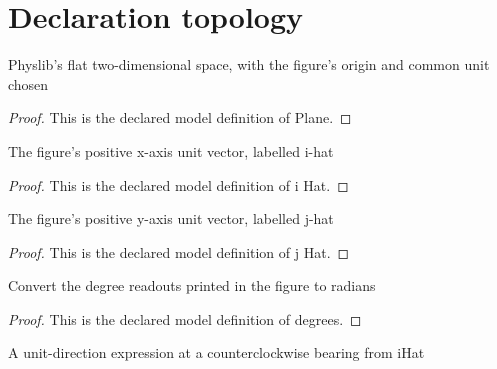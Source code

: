 \section{Declaration topology}
\begin{definition}[Plane]
  \label{def:physics:phyx-mini-0791:phyxminiproblems-problemphyxmini0791-plane}
  Physlib's flat two-dimensional space, with the figure's origin and common unit chosen
\end{definition}
\begin{proof}
  This is the declared model definition of Plane.
\end{proof}
\begin{definition}[i Hat]
  \label{def:physics:phyx-mini-0791:phyxminiproblems-problemphyxmini0791-ihat}
  The figure's positive x-axis unit vector, labelled i-hat
\end{definition}
\begin{proof}
  This is the declared model definition of i Hat.
\end{proof}
\begin{definition}[j Hat]
  \label{def:physics:phyx-mini-0791:phyxminiproblems-problemphyxmini0791-jhat}
  The figure's positive y-axis unit vector, labelled j-hat
\end{definition}
\begin{proof}
  This is the declared model definition of j Hat.
\end{proof}
\begin{definition}[degrees]
  \label{def:physics:phyx-mini-0791:phyxminiproblems-problemphyxmini0791-degrees}
  Convert the degree readouts printed in the figure to radians
\end{definition}
\begin{proof}
  This is the declared model definition of degrees.
\end{proof}
\begin{definition}[direction At]
  \label{def:physics:phyx-mini-0791:phyxminiproblems-problemphyxmini0791-directionat}
  A unit-direction expression at a counterclockwise bearing from iHat
\end{definition}
